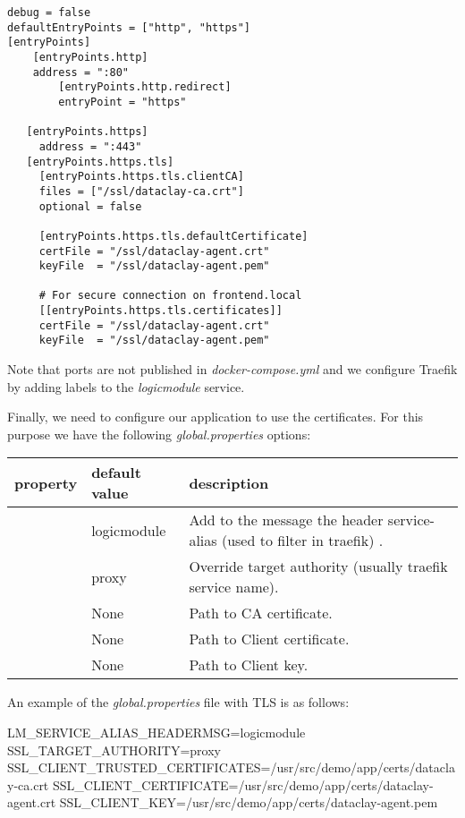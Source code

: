 \begin{tBox}
 \begin{lstlisting}[language=docker-compose-2, frame=none]
debug = false
defaultEntryPoints = ["http", "https"]
[entryPoints]
    [entryPoints.http]
    address = ":80"
        [entryPoints.http.redirect]
        entryPoint = "https"

   [entryPoints.https]
     address = ":443"
   [entryPoints.https.tls]
     [entryPoints.https.tls.clientCA]
     files = ["/ssl/dataclay-ca.crt"]
     optional = false

	 [entryPoints.https.tls.defaultCertificate]
     certFile = "/ssl/dataclay-agent.crt"
     keyFile  = "/ssl/dataclay-agent.pem"
     
     # For secure connection on frontend.local
     [[entryPoints.https.tls.certificates]]
     certFile = "/ssl/dataclay-agent.crt"
     keyFile  = "/ssl/dataclay-agent.pem"
 \end{lstlisting}
\end{tBox}

Note that ports are not published in \textit{docker-compose.yml} and we configure Traefik by adding labels to the \textit{logicmodule} service.

Finally, we need to configure our application to use the certificates. For this purpose we have the following \textit{global.properties} options:

\begin{table}[H]
\footnotesize
\begin{tBox}
\centering
\begin{tabular}{p{57mm} | p{27mm} |  >{\raggedright\arraybackslash}p{50mm}}
\textbf{property} & \textbf{default value} & \textbf{description} \\
\hline
\verb LM_SERVICE_ALIAS_HEADERMSG & logicmodule & Add to the message the header service-alias (used to filter in traefik) . \\
\hline
\verb SSL_TARGET_AUTHORITY & proxy  & Override target authority (usually traefik service name). \\
\hline
\verb SSL_CLIENT_TRUSTED_CERTIFICATES & None & Path to CA certificate. \\
\hline
\verb SSL_CLIENT_CERTIFICATE & None & Path to Client certificate. \\
\hline
\verb SSL_CLIENT_KEY & None & Path to Client key. \\
\end{tabular}
\label{table:Security}
\end{tBox}
\end{table}

An example of the \textit{global.properties} file with TLS is as follows:

\begin{tBox}
 \begin{bash}
LM_SERVICE_ALIAS_HEADERMSG=logicmodule
SSL_TARGET_AUTHORITY=proxy 
SSL_CLIENT_TRUSTED_CERTIFICATES=/usr/src/demo/app/certs/dataclay-ca.crt
SSL_CLIENT_CERTIFICATE=/usr/src/demo/app/certs/dataclay-agent.crt
SSL_CLIENT_KEY=/usr/src/demo/app/certs/dataclay-agent.pem
 \end{bash}
\end{tBox}